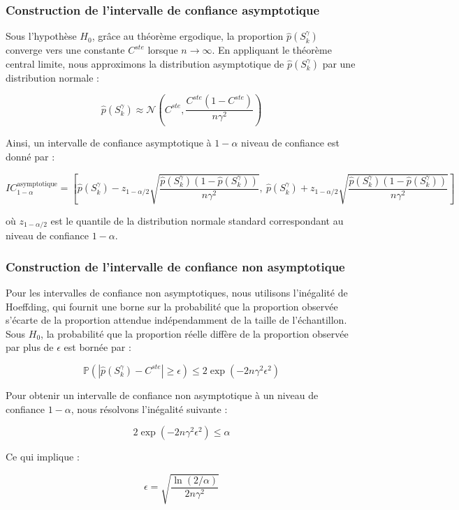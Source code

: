 \documentclass[12pt,a4paper]{article}
\theoremstyle{definition}
\theoremstyle{remark}
\begin{document}
\subsubsection{Construction de l'intervalle de confiance asymptotique}

Sous l'hypothèse $H_0$, grâce au théorème ergodique, la proportion $\hat{p}(S_k^{\gamma})$ converge vers une constante $C^{ste}$ lorsque $n \to \infty$. En appliquant le théorème central limite, nous approximons la distribution asymptotique de $\hat{p}(S_k^{\gamma})$ par une distribution normale :

$$
\hat{p}(S_k^{\gamma}) \approx \mathcal{N}\left(C^{ste}, \frac{C^{ste}(1 - C^{ste})}{n \gamma^2}\right)
$$

Ainsi, un intervalle de confiance asymptotique à $1 - \alpha$ niveau de confiance est donné par :

$$
IC_{1 - \alpha}^{\text{asymptotique}} = \left[ \hat{p}(S_k^{\gamma}) - z_{1 - \alpha/2} \sqrt{\frac{\hat{p}(S_k^{\gamma})(1 - \hat{p}(S_k^{\gamma}))}{n \gamma^2}}, \ \hat{p}(S_k^{\gamma}) + z_{1 - \alpha/2} \sqrt{\frac{\hat{p}(S_k^{\gamma})(1 - \hat{p}(S_k^{\gamma}))}{n \gamma^2}} \right]
$$

où $z_{1 - \alpha/2}$ est le quantile de la distribution normale standard correspondant au niveau de confiance $1 - \alpha$.

\subsubsection{Construction de l'intervalle de confiance non asymptotique}

Pour les intervalles de confiance non asymptotiques, nous utilisons l'inégalité de Hoeffding, qui fournit une borne sur la probabilité que la proportion observée s'écarte de la proportion attendue indépendamment de la taille de l'échantillon. Sous $H_0$, la probabilité que la proportion réelle diffère de la proportion observée par plus de $\epsilon$ est bornée par :

$$
\mathbb{P}\left( \left| \hat{p}(S_k^{\gamma}) - C^{ste} \right| \geq \epsilon \right) \leq 2 \exp(-2 n \gamma^2 \epsilon^2)
$$

Pour obtenir un intervalle de confiance non asymptotique à un niveau de confiance $1 - \alpha$, nous résolvons l'inégalité suivante :

$$
2 \exp(-2 n \gamma^2 \epsilon^2) \leq \alpha
$$

Ce qui implique :

$$
\epsilon = \sqrt{\frac{\ln(2/\alpha)}{2 n \gamma^2}}
$$
\end{document}
